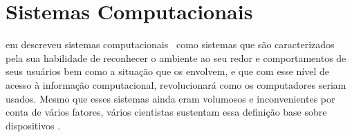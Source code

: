 \section{Sistemas Computacionais \Wearables}

    
        \citeauthor{starner1996human} em \citeyear{starner1996human} descreveu sistemas computacionais \wearables\ como sistemas que são caracterizados pela sua habilidade de reconhecer o ambiente ao seu redor e comportamentos de seus usuários bem como a situação que os envolvem, e que com esse nível de acesso à informação computacional, revolucionará como os computadores seriam usados.
        Mesmo que esses sistemas ainda eram volumosos e inconvenientes por conta de vários fatores, vários cientistas sustentam essa definição base sobre dispositivos \wearables.\ 
    
